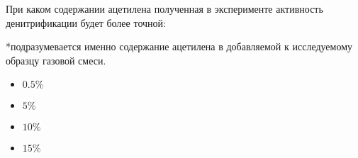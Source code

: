 
При каком содержании ацетилена полученная в эксперименте активность денитрификации будет более точной:

*подразумевается именно содержание ацетилена в добавляемой к исследуемому образцу газовой смеси.  

\begin{itemize}
    \item $0.5\%$
    \item $5\%$
    \item $10\%$
    \item $15\%$
\end{itemize}
